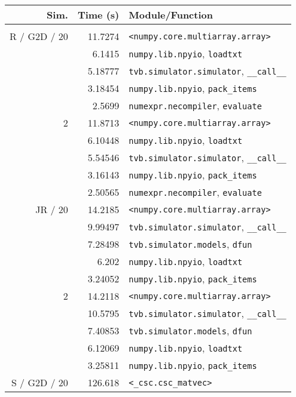 \begin{table}
{\footnotesize \begin{tabular}{r | r | l }
Sim. &        Time (s) &                     Module/Function \\
\hline \\
R / G2D / 20  &         11.7274 & \texttt{<numpy.core.multiarray.array>} \\
&          6.1415 & \texttt{numpy.lib.npyio}, \texttt{loadtxt} \\
 &         5.18777 & \texttt{tvb.simulator.simulator}, \texttt{\_\_call\_\_} \\
 &         3.18454 & \texttt{numpy.lib.npyio}, \texttt{pack\_items} \\
 &          2.5699 & \texttt{numexpr.necompiler}, \texttt{evaluate} \\
\hline
2 &         11.8713 & \texttt{<numpy.core.multiarray.array>} \\
&         6.10448 & \texttt{numpy.lib.npyio}, \texttt{loadtxt} \\
 &         5.54546 & \texttt{tvb.simulator.simulator}, \texttt{\_\_call\_\_} \\
 &         3.16143 & \texttt{numpy.lib.npyio}, \texttt{pack\_items} \\
 &         2.50565 & \texttt{numexpr.necompiler}, \texttt{evaluate} \\
\hline
 JR / 20  &         14.2185 & \texttt{<numpy.core.multiarray.array>} \\
&         9.99497 & \texttt{tvb.simulator.simulator}, \texttt{\_\_call\_\_} \\
 &         7.28498 & \texttt{tvb.simulator.models}, \texttt{dfun} \\
 &           6.202 & \texttt{numpy.lib.npyio}, \texttt{loadtxt} \\
 &         3.24052 & \texttt{numpy.lib.npyio}, \texttt{pack\_items} \\
\hline
2 &         14.2118 & \texttt{<numpy.core.multiarray.array>} \\
&         10.5795 & \texttt{tvb.simulator.simulator}, \texttt{\_\_call\_\_} \\
 &         7.40853 & \texttt{tvb.simulator.models}, \texttt{dfun} \\
 &         6.12069 & \texttt{numpy.lib.npyio}, \texttt{loadtxt} \\
 &         3.25811 & \texttt{numpy.lib.npyio}, \texttt{pack\_items} \\
\hline
S / G2D / 20 &         126.618 & \texttt{<\_csc.csc\_matvec>} \\

\end{tabular}}
\end{table}
